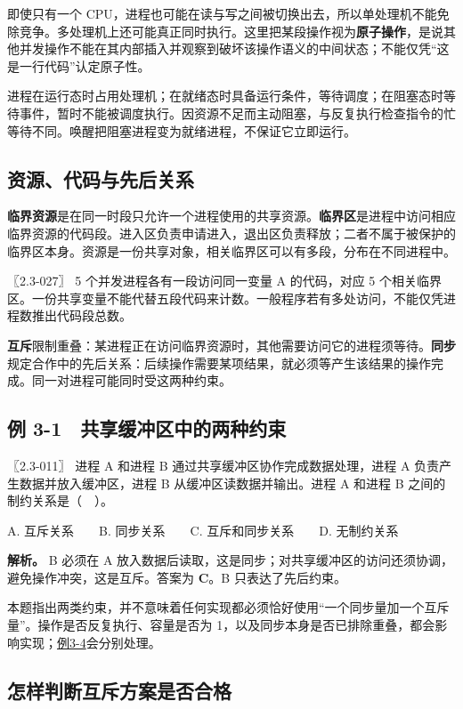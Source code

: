 即使只有一个 CPU，进程也可能在读与写之间被切换出去，所以单处理机不能免除竞争。多处理机上还可能真正同时执行。这里把某段操作视为\textbf{原子操作}，是说其他并发操作不能在其内部插入并观察到破坏该操作语义的中间状态；不能仅凭``这是一行代码''认定原子性。

进程在运行态时占用处理机；在就绪态时具备运行条件，等待调度；在阻塞态时等待事件，暂时不能被调度执行。因资源不足而主动阻塞，与反复执行检查指令的忙等待不同。唤醒把阻塞进程变为就绪进程，不保证它立即运行。

\subsection{资源、代码与先后关系}\label{os-c03-h19}

\textbf{临界资源}是在同一时段只允许一个进程使用的共享资源。\textbf{临界区}是进程中访问相应临界资源的代码段。进入区负责申请进入，退出区负责释放；二者不属于被保护的临界区本身。资源是一份共享对象，相关临界区可以有多段，分布在不同进程中。

\noindent{}〖2.3-027〗 5 个并发进程各有一段访问同一变量 A 的代码，对应 5 个相关临界区。一份共享变量不能代替五段代码来计数。一般程序若有多处访问，不能仅凭进程数推出代码段总数。

\textbf{互斥}限制重叠：某进程正在访问临界资源时，其他需要访问它的进程须等待。\textbf{同步}规定合作中的先后关系：后续操作需要某项结果，就必须等产生该结果的操作完成。同一对进程可能同时受这两种约束。

\subsection{例 3-1　共享缓冲区中的两种约束}\label{ex-err11}

\noindent{}〖2.3-011〗 进程 A 和进程 B 通过共享缓冲区协作完成数据处理，进程 A 负责产生数据并放入缓冲区，进程 B 从缓冲区读数据并输出。进程 A 和进程 B 之间的制约关系是（　）。

A. 互斥关系　　B. 同步关系　　C. 互斥和同步关系　　D. 无制约关系


\textbf{解析。} B 必须在 A 放入数据后读取，这是同步；对共享缓冲区的访问还须协调，避免操作冲突，这是互斥。答案为 \textbf{C}。B 只表达了先后约束。

本题指出两类约束，并不意味着任何实现都必须恰好使用``一个同步量加一个互斥量''。操作是否反复执行、容量是否为 1，以及同步本身是否已排除重叠，都会影响实现；\hyperref[ex-2024]{例3-4}会分别处理。

\subsection{怎样判断互斥方案是否合格}\label{os-c03-h37}

